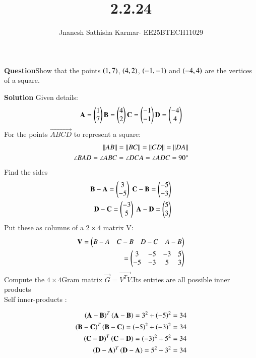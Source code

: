 \documentclass[journal]{IEEEtran}
\theoremstyle{remark}
\begin{document}
\setlength{\abovedisplayskip}{0pt}
\setlength{\belowdisplayskip}{0pt}
\setlength{\abovedisplayshortskip}{0pt}
\setlength{\belowdisplayshortskip}{0pt}

\onecolumn

\title{2.2.24}
\author{Jnanesh Sathisha Karmar- EE25BTECH11029}
\maketitle


\renewcommand{\thefigure}{\theenumi}
\renewcommand{\thetable}{\theenumi}
\textbf{Question}Show that the points $\left(1, 7\right)$, $\left(4, 2\right)$, $\left(-1, -1\right)$ and $\left(-4, 4\right)$ are the vertices of a square.

\textbf{Solution}
Given details:
\begin{align}
    \mathbf{A}=\begin{pmatrix}1\\7\end{pmatrix}  \mathbf{B}=\begin{pmatrix}4\\2\end{pmatrix} \mathbf{C}=\begin{pmatrix}-1\\-1\end{pmatrix} \mathbf{D}=\begin{pmatrix}-4\\4\end{pmatrix}
\end{align}
For the points $\vec{ABCD}$ to represent a square:
\begin{align}
    \left\lVert AB\right\rVert=\left\lVert BC\right\rVert=\left\lVert CD\right\rVert=\left\lVert DA\right\rVert\\
    \angle{BAD}=\angle{ABC}=\angle{DCA}=\angle{ADC}=90\degree{}
\end{align}
Find the sides
\begin{align}
\vec{B}-\vec{A}=\myvec{3\\-5} \  \vec{C}-\vec{B}=\myvec{-5\\-3} \\
\vec{D}-\vec{C}=\myvec{-3\\5} \ 
\vec{A}-\vec{D}=\myvec{5\\3}
\end{align}
Put these as columns of a $2\times4$ matrix V:
\begin{align}
    \mathbf{V}=\begin{pmatrix}B-A&C-B&D-C&A-B\end{pmatrix}\\
    =\begin{pmatrix}3 & -5 & -3 & 5\\-5 & -3 & 5 & 3\end{pmatrix}
\end{align}
Compute the $4\times4$Gram matrix $\vec{G}=\vec{V^TV}$.Its entries are all possible inner products\\
Self inner-products \brak{\text{diagonal of G}}:

\begin{align}
    {\ensuremath{\left(\mathbf{A-B}\right)}^T\ensuremath{\left(\mathbf{A-B}\right)}}={3^2+\left(-5\right)^2}={34}\\
    {\left(\mathbf{B-C}\right)^T\left(\mathbf{B-C}\right)}={\left(-5\right)^2+\left(-3\right)^2}={34}\\
    {\left(\mathbf{C-D}\right)^T\left(\mathbf{C-D}\right)}=\left(-3\right)^2+5^2={34}\\
    \left(\mathbf{D-A}\right)^T\left(\mathbf{D-A}\right)=5^2+3^2=34
\end{align}
\end{document}
